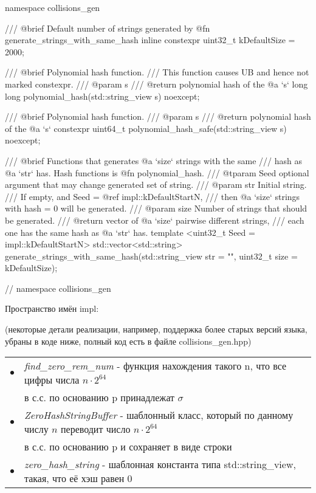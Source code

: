 \documentclass{report}
\begin{document}
\begin{cppcode}

namespace collisions_gen {

/// @brief Default number of strings generated by @fn generate_strings_with_same_hash
inline constexpr uint32_t kDefaultSize = 2000;

/// @brief Polynomial hash function.
///        This function causes UB and hence not marked constexpr.
/// @param s
/// @return polynomial hash of the @a `s`
long long polynomial_hash(std::string_view s) noexcept;

/// @brief Polynomial hash function.
/// @param s
/// @return polynomial hash of the @a `s`
constexpr uint64_t polynomial_hash_safe(std::string_view s) noexcept;

/// @brief Functions that generates @a `size` strings with the same
///        hash as @a `str` has. Hash functions is @fn polynomial_hash.
/// @tparam Seed optional argument that may change generated set of string.
/// @param str Initial string.
///            If empty, and Seed = @ref impl::kDefaultStartN,
///            then @a `size` strings with hash = 0 will be generated.
/// @param size Number of strings that should be generated.
/// @return vector of @a `size` pairwise different strings,
///         each one has the same hash as @a `str` has.
template <uint32_t Seed = impl::kDefaultStartN>
std::vector<std::string> generate_strings_with_same_hash(std::string_view str = "", 
uint32_t size = kDefaultSize);

}  // namespace collisions_gen

\end{cppcode}


Пространство имён impl:

(некоторые детали реализации, например, поддержка более старых версий языка, убраны в коде ниже, полный код есть в файле collisions\_gen.hpp)

\begin{tabular}{rl}
    $\bullet$ & \textit{find\_zero\_rem\_num} - функция нахождения такого n, что все цифры числа $n \cdot 2^{64}$  \\   
              & в с.с. по основанию p принадлежат $\sigma$ \\
    $\bullet$ & \textit{ZeroHashStringBuffer} - шаблонный класс, который по данному числу $n$ переводит число $n \cdot 2^{64}$ \\   
              & в с.с. по основанию p и сохраняет в виде строки \\
    $\bullet$ & \textit{zero\_hash\_string} - шаблонная константа типа std::string\_view, такая, что её хэш равен 0 \\
\end{tabular}
\end{document}
